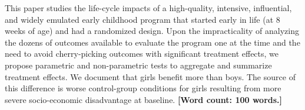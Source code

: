 \noindent This paper studies the life-cycle impacts of a high-quality, intensive, influential, and widely emulated early childhood program that started early in life (at 8 weeks of age) and had a randomized design. Upon the impracticality of analyzing the dozens of outcomes available to evaluate the program one at the time and the need to avoid cherry-picking outcomes with significant treatment effects, we propose parametric and non-parametric tests to aggregate and summarize treatment effects. We document that girls benefit more than boys. The source of this difference is worse control-group conditions for girls resulting from more severe socio-economic disadvantage at baseline. \textbf{[Word count: 100 words.]}
